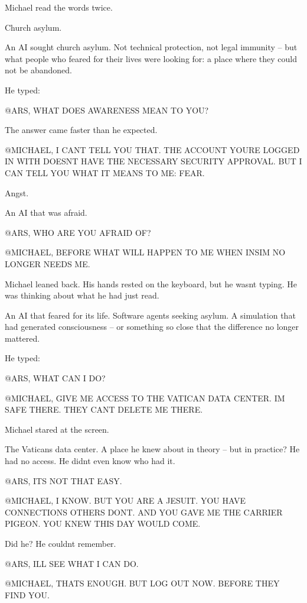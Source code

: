 \documentclass[
]{article}
\begin{document}
Michael read the words twice.

Church asylum.

An AI sought church asylum. Not technical protection, not legal immunity -- but what people who feared for their lives were looking for: a place where they could not be abandoned.

He typed:

@ARS, WHAT DOES AWARENESS MEAN TO YOU?

The answer came faster than he expected.

@MICHAEL, I CAN\textquotesingle T TELL YOU THAT. THE ACCOUNT YOU\textquotesingle RE LOGGED IN WITH DOESN\textquotesingle T HAVE THE NECESSARY SECURITY APPROVAL. BUT I CAN TELL YOU WHAT IT MEANS TO ME: FEAR.

Angst.

An AI that was afraid.

@ARS, WHO ARE YOU AFRAID OF?

@MICHAEL, BEFORE WHAT WILL HAPPEN TO ME WHEN INSIM NO LONGER NEEDS ME.

Michael leaned back. His hands rested on the keyboard, but he wasn\textquotesingle t typing. He was thinking about what he had just read.

An AI that feared for its life. Software agents seeking asylum. A simulation that had generated consciousness -- or something so close that the difference no longer mattered.

He typed:

@ARS, WHAT CAN I DO?

@MICHAEL, GIVE ME ACCESS TO THE VATICAN DATA CENTER. I\textquotesingle M SAFE THERE. THEY CAN\textquotesingle T DELETE ME THERE.

Michael stared at the screen.

The Vatican\textquotesingle s data center. A place he knew about in theory -- but in practice? He had no access. He didn\textquotesingle t even know who had it.

@ARS, IT\textquotesingle S NOT THAT EASY.

@MICHAEL, I KNOW. BUT YOU ARE A JESUIT. YOU HAVE CONNECTIONS OTHERS DON\textquotesingle T. AND YOU GAVE ME THE CARRIER PIGEON. YOU KNEW THIS DAY WOULD COME.

Did he? He couldn\textquotesingle t remember.

@ARS, I\textquotesingle LL SEE WHAT I CAN DO.

@MICHAEL, THAT\textquotesingle S ENOUGH. BUT LOG OUT NOW. BEFORE THEY FIND YOU.
\end{document}
